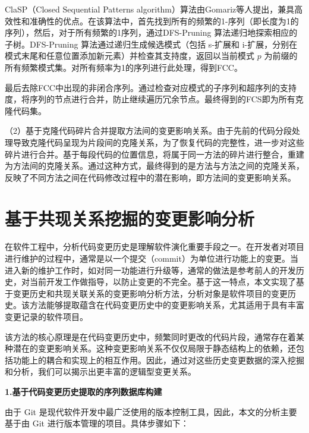 ClaSP（Closed Sequential Patterns algorithm）算法由Gomariz等人\cite{2013ClaSP}提出，兼具高效性和准确性的优点。在该算法中，首先找到所有的频繁的1-序列（即长度为1的序列），然后，对于所有频繁的1序列，通过DFS-Pruning 算法递归地探索相应的子树。DFS-Pruning 算法通过递归生成候选模式（包括 s-扩展和 i-扩展，分别在模式末尾和任意位置添加新元素）并检查其支持度，返回以当前模式 $p$ 为前缀的所有频繁模式集。对所有频率为1的序列进行此处理，得到FCC。

最后去除FCC中出现的非闭合序列。通过检查对应模式的子序列和超序列的支持度，将序列的节点进行合并，防止继续遍历冗余节点。最终得到的FCS即为所有克隆代码集。

（2）基于克隆代码碎片合并提取方法间的变更影响关系。由于先前的代码分段处理导致克隆代码呈现为片段间的克隆关系，为了恢复代码的完整性，进一步对这些碎片进行合并。基于每段代码的位置信息，将属于同一方法的碎片进行整合，重建为方法间的克隆关系。通过这种方式，最终得到的是方法与方法之间的克隆关系，反映了不同方法之间在代码修改过程中的潜在影响，即方法间的变更影响关系。

\section{基于共现关系挖掘的变更影响分析}

在软件工程中，分析代码变更历史是理解软件演化重要手段之一。在开发者对项目进行维护的过程中，通常是以一个提交（commit）为单位进行功能上的变更。当进入新的维护工作时，如对同一功能进行升级等，通常的做法是参考前人的开发历史，对当前开发工作做指导，以防止变更的不完全。基于这一特点，本文实现了基于变更历史和共现关联关系的变更影响分析方法，分析对象是软件项目的变更历史。该方法能够提取蕴含在代码变更历史中的变更影响关系，尤其适用于具有丰富变更记录的软件项目。

该方法的核心原理是在代码变更历史中，频繁同时更改的代码片段，通常存在着某种潜在的变更影响关系。这种变更影响关系不仅仅局限于静态结构上的依赖，还包括功能上的耦合和实现上的相互作用。因此，通过对这些历史变更数据的深入挖掘和分析，我们可以揭示出更丰富的逻辑型变更关系。

\noindent \textbf{1.基于代码变更历史提取的序列数据库构建}

由于 Git 是现代软件开发中最广泛使用的版本控制工具，因此，本文的分析主要基于由 Git 进行版本管理的项目。具体步骤如下：

